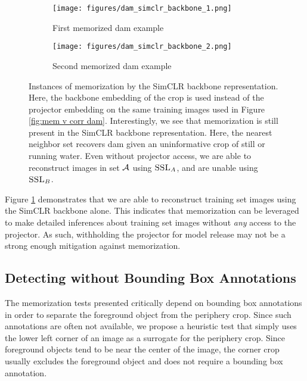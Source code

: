 \begin{figure}[h]
     \centering
     \begin{subfigure}[b]{\textwidth}
         \centering
         \texttt{[image: figures/dam\_simclr\_backbone\_1.png]}
         \caption{First {\color{part_orange}memorized} dam example}
     \end{subfigure}
     \begin{subfigure}[b]{\textwidth}
         \centering
         \texttt{[image: figures/dam\_simclr\_backbone\_2.png]}
         \caption{Second {\color{part_orange}memorized} dam example}
     \end{subfigure}
     \hfill
     \caption[Instances of \dejavu memorization by the SimCLR backbone representation.]{Instances of \dejavu memorization by the SimCLR backbone representation. Here, the backbone embedding of the crop is used instead of the projector embedding on the same training images used in Figure \ref{fig:mem v corr dam}. Interestingly, we see that \dejavu memorization is still present in the SimCLR backbone representation. Here, the nearest neighbor set recovers dam given an uninformative crop of still or running water. Even without projector access, we are able to reconstruct images in set $\mathcal{A}$ using $\textsc{SSL}_A$, and are unable using $\textsc{SSL}_B$. }
     \label{fig:simclr backbone dejavu}
\end{figure}


Figure \ref{fig:simclr backbone dejavu} demonstrates that we are able to reconstruct training set images using the SimCLR backbone alone. This indicates that \dejavu memorization can be leveraged to make detailed inferences about training set images without \emph{any} access to the projector. As such, withholding the projector for model release may not be a strong enough mitigation against \dejavu memorization.  

\clearpage

\subsection{Detecting \Dejavu without Bounding Box Annotations}
\label{sec:appx corner crop} 
The memorization tests presented critically depend on bounding box annotations in order to separate the foreground object from the periphery crop. Since such annotations are often not available, we propose a heuristic test that simply uses the lower left corner of an image as a surrogate for the periphery crop. Since foreground objects tend to be near the center of the image, the corner crop usually excludes the foreground object and does not require a bounding box annotation. 

